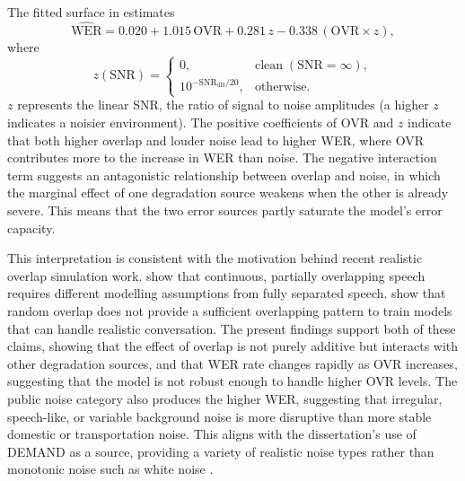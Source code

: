 The fitted surface in  estimates
\begin{equation}
    \widehat{\mathrm{WER}} =
    0.020 + 1.015\,\mathrm{OVR} + 0.281\,z - 0.338\,(\mathrm{OVR}\times z),
\end{equation}
where
\begin{equation}
    z(\mathrm{SNR}) =
    \begin{cases}
        0, & \mathrm{clean}\;(\mathrm{SNR}=\infty),\\
        10^{-\mathrm{SNR}_{\mathrm{dB}}/20}, & \text{otherwise}.
    \end{cases}
\end{equation}
$z$ represents the linear SNR, the ratio of signal to noise amplitudes (a higher $z$ indicates a noisier environment). The positive coefficients of OVR and $z$ indicate that both higher overlap and louder noise lead to higher WER, where OVR contributes more to the increase in WER than noise. The negative interaction term suggests an antagonistic relationship between overlap and noise, in which the marginal effect of one degradation source weakens when the other is already severe. This means that the two error sources partly saturate the model's error capacity.

This interpretation is consistent with the motivation behind recent realistic overlap simulation work. \citet{chen2020continuousspeechseparationdataset} show that continuous, partially overlapping speech requires different modelling assumptions from fully separated speech. \citet{yang2022simulatingrealisticspeechoverlaps} show that random overlap does not provide a sufficient overlapping pattern to train models that can handle realistic conversation. The present findings support both of these claims, showing that the effect of overlap is not purely additive but interacts with other degradation sources, and that WER rate changes rapidly as OVR increases, suggesting that the model is not robust enough to handle higher OVR levels. The public noise category also produces the higher WER, suggesting that irregular, speech-like, or variable background noise is more disruptive than more stable domestic or transportation noise. This aligns with the dissertation's use of DEMAND as a source, providing a variety of realistic noise types rather than monotonic noise such as white noise \cite{demand}.

